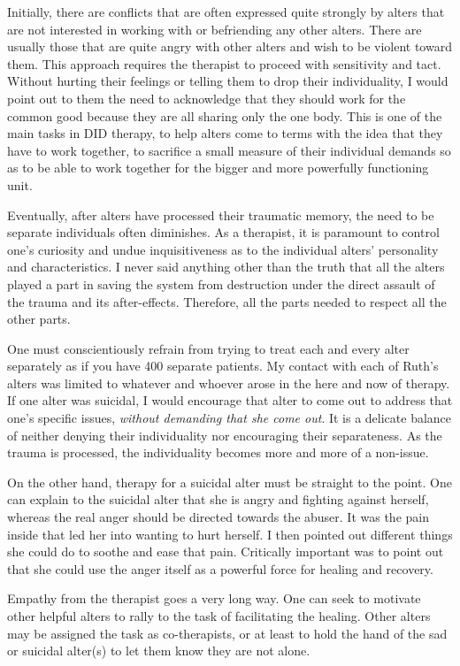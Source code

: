 \documentclass[]{book}
\begin{document}
Initially, there are conflicts that are often expressed quite strongly by alters that are not interested in working with or befriending any other alters. There are usually those that are quite angry with other alters and wish to be violent toward them. This approach requires the therapist to proceed with sensitivity and tact. Without hurting their feelings or telling them to drop their individuality, I would point out to them the need to acknowledge that they should work for the common good because they are all sharing only the one body. This is one of the main tasks in DID therapy, to help alters come to terms with the idea that they have to work together, to sacrifice a small measure of their individual demands so as to be able to work together for the bigger and more powerfully functioning unit.

Eventually, after alters have processed their traumatic memory, the need to be separate individuals often diminishes. As a therapist, it is paramount to control one's curiosity and undue inquisitiveness as to the individual alters' personality and characteristics. I never said anything other than the truth that all the alters played a part in saving the system from destruction under the direct assault of the trauma and its after-effects. Therefore, all the parts needed to respect all the other parts.

One must conscientiously refrain from trying to treat each and every alter separately as if you have 400 separate patients. My contact with each of Ruth's alters was limited to whatever and whoever arose in the here and now of therapy. If one alter was suicidal, I would encourage that alter to come out to address that one's specific issues, \emph{without demanding that she come out}. It is a delicate balance of neither denying their individuality nor encouraging their separateness. As the trauma is processed, the individuality becomes more and more of a non-issue.

On the other hand, therapy for a suicidal alter must be straight to the point. One can explain to the suicidal alter that she is angry and fighting against herself, whereas the real anger should be directed towards the abuser. It was the pain inside that led her into wanting to hurt herself. I then pointed out different things she could do to soothe and ease that pain. Critically important was to point out that she could use the anger itself as a powerful force for healing and recovery.

Empathy from the therapist goes a very long way. One can seek to motivate other helpful alters to rally to the task of facilitating the healing. Other alters may be assigned the task as co-therapists, or at least to hold the hand of the sad or suicidal alter(s) to let them know they are not alone.
\end{document}
